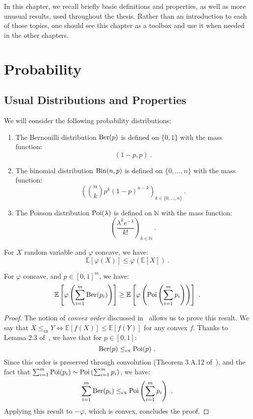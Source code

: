 In this chapter, we recall briefly basic definitions and properties, as well as more unusual results, used throughout the thesis. Rather than an introduction to each of those topics, one should see this chapter as a toolbox and use it when needed in the other chapters.

\section{Probability}
\subsection{Usual Distributions and Properties}
\begin{definition}
  We will consider the following probability distributions:
  \begin{enumerate}
  \item The Bernouilli distribution $\operatorname{\text{Ber}}(p)$ is defined on $\{0,1\}$ with the mass function:
        \[ (1-p,p) \ . \]
  \item The binomial distribution $\operatorname{\text{Bin}}(n,p)$ is defined on $\{0,\ldots,n\}$ with the mass function:
        \[ \left(\binom{n}{k}p^k(1-p)^{n-k}\right)_{k \in \{0,\ldots,n\}} \ .\]
  \item The Poisson distribution $\operatorname{\text{Poi}}(\lambda)$ is defined on $\mathbb{N}$ with the mass function:
        \[ \left(\frac{\lambda^ke^{-\lambda}}{k!}\right)_{k \in \mathbb{N}} \ .\]
  \end{enumerate}      
\end{definition}

\begin{proposition}
   For $X$ random variable and $\varphi$ concave, we have:
   \[ \mathbb{E}\left[\varphi(X)\right] \leq \varphi\left(\mathbb{E}[X]\right) \ . \]
\end{proposition}

\begin{proposition}
    For $\varphi$ concave, and $p \in [0,1]^m$, we have:
    \[\mathbb{E}\left[\varphi\left(\sum_{i=1}^m\operatorname{\text{Ber}}(p_i)\right)\right] \geq \mathbb{E}\left[\varphi\left(\operatorname{\text{Poi}}\left(\sum_{i=1}^m p_i\right)\right)\right]\ .\]
  \label{prop:ConvexOrder}
\end{proposition}

\begin{proof}
  The notion of \emph{convex order} discussed in~\cite{SS07} allows us to prove this result. We say that $X \leq_{\text{cx}} Y \iff \mathbb{E}[f(X)] \leq \mathbb{E}[f(Y)]$ for any convex $f$. Thanks to Lemma 2.3 of~\cite{BFGG20}, we have that for $p \in [0,1]$:
  \[\Ber(p) \leq_{\text{cx}} \Poi(p)\ .\]
  Since this order is preserved through convolution (Theorem 3.A.12 of~\cite{SS07}), and the fact that $\sum_{i=1}^m \operatorname{\text{Poi}}(p_i) \sim \operatorname{\text{Poi}}\left(\sum_{i=1}^m p_i\right)$, we have:
  \[\sum_{i=1}^m\operatorname{\text{Ber}}(p_i) \leq_{\text{cx}}  \operatorname{\text{Poi}}\left(\sum_{i=1}^m p_i\right)\ .\]
  Applying this result to $-\varphi$, which is convex, concludes the proof.
\end{proof}

